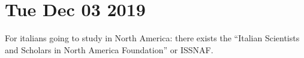 \documentclass[main.tex]{subfiles}
\begin{document}
\section*{Tue Dec 03 2019}

For italians going to study in North America: there exists the ``Italian Scientists and Scholars in North America Foundation'' or ISSNAF. 
\end{document}
